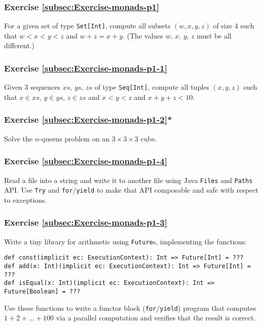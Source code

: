 \subsubsection{Exercise \label{subsec:Exercise-monads-p1}\ref{subsec:Exercise-monads-p1}}

For a given set of type \lstinline!Set[Int]!, compute all subsets
$\left(w,x,y,z\right)$ of size 4 such that $w<x<y<z$ and $w+z=x+y$.
(The values $w$, $x$, $y$, $z$ must be all different.)

\subsubsection{Exercise \label{subsec:Exercise-monads-p1-1}\ref{subsec:Exercise-monads-p1-1}}

Given 3 sequences $xs$, $ys$, $zs$ of type \lstinline!Seq[Int]!,
compute all tuples $\left(x,y,z\right)$ such that $x\in xs$, $y\in ys$,
$z\in zs$ and $x<y<z$ and $x+y+z<10$.

\subsubsection{Exercise \label{subsec:Exercise-monads-p1-2}\ref{subsec:Exercise-monads-p1-2}{*}}

Solve the $n$-queens problem on an $3\times3\times3$ cube.

\subsubsection{Exercise \label{subsec:Exercise-monads-p1-4}\ref{subsec:Exercise-monads-p1-4}}

Read a file into a string and write it to another file using Java
\lstinline!Files! and \lstinline!Paths! API. Use \lstinline!Try!
and \lstinline!for!/\lstinline!yield! to make that API composable
and safe with respect to exceptions.

\subsubsection{Exercise \label{subsec:Exercise-monads-p1-3}\ref{subsec:Exercise-monads-p1-3}}

Write a tiny library for arithmetic using \lstinline!Future!s, implementing
the functions:
\begin{lstlisting}
def const(implicit ec: ExecutionContext): Int => Future[Int] = ???
def add(x: Int)(implicit ec: ExecutionContext): Int => Future[Int] = ???
def isEqual(x: Int)(implicit ec: ExecutionContext): Int => Future[Boolean] = ??? 
\end{lstlisting}
Use these functions to write a functor block (\lstinline!for!/\lstinline!yield!)
program that computes $1+2+...+100$ via a parallel computation and
verifies that the result is correct.

